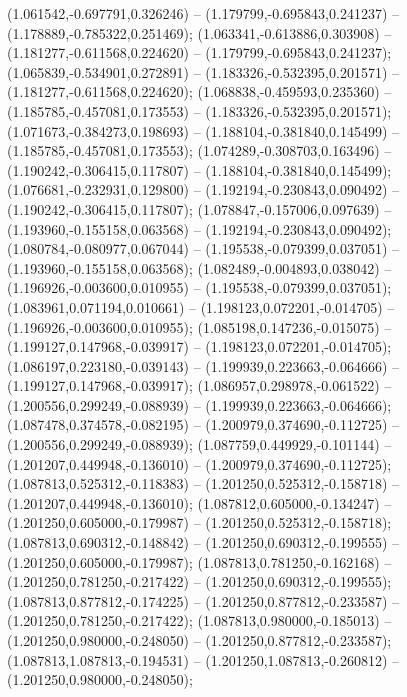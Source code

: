  (1.061542,-0.697791,0.326246) -- (1.179799,-0.695843,0.241237) -- (1.178889,-0.785322,0.251469);
 (1.063341,-0.613886,0.303908) -- (1.181277,-0.611568,0.224620) -- (1.179799,-0.695843,0.241237);
 (1.065839,-0.534901,0.272891) -- (1.183326,-0.532395,0.201571) -- (1.181277,-0.611568,0.224620);
 (1.068838,-0.459593,0.235360) -- (1.185785,-0.457081,0.173553) -- (1.183326,-0.532395,0.201571);
 (1.071673,-0.384273,0.198693) -- (1.188104,-0.381840,0.145499) -- (1.185785,-0.457081,0.173553);
 (1.074289,-0.308703,0.163496) -- (1.190242,-0.306415,0.117807) -- (1.188104,-0.381840,0.145499);
 (1.076681,-0.232931,0.129800) -- (1.192194,-0.230843,0.090492) -- (1.190242,-0.306415,0.117807);
 (1.078847,-0.157006,0.097639) -- (1.193960,-0.155158,0.063568) -- (1.192194,-0.230843,0.090492);
 (1.080784,-0.080977,0.067044) -- (1.195538,-0.079399,0.037051) -- (1.193960,-0.155158,0.063568);
 (1.082489,-0.004893,0.038042) -- (1.196926,-0.003600,0.010955) -- (1.195538,-0.079399,0.037051);
 (1.083961,0.071194,0.010661) -- (1.198123,0.072201,-0.014705) -- (1.196926,-0.003600,0.010955);
 (1.085198,0.147236,-0.015075) -- (1.199127,0.147968,-0.039917) -- (1.198123,0.072201,-0.014705);
 (1.086197,0.223180,-0.039143) -- (1.199939,0.223663,-0.064666) -- (1.199127,0.147968,-0.039917);
 (1.086957,0.298978,-0.061522) -- (1.200556,0.299249,-0.088939) -- (1.199939,0.223663,-0.064666);
 (1.087478,0.374578,-0.082195) -- (1.200979,0.374690,-0.112725) -- (1.200556,0.299249,-0.088939);
 (1.087759,0.449929,-0.101144) -- (1.201207,0.449948,-0.136010) -- (1.200979,0.374690,-0.112725);
 (1.087813,0.525312,-0.118383) -- (1.201250,0.525312,-0.158718) -- (1.201207,0.449948,-0.136010);
 (1.087812,0.605000,-0.134247) -- (1.201250,0.605000,-0.179987) -- (1.201250,0.525312,-0.158718);
 (1.087813,0.690312,-0.148842) -- (1.201250,0.690312,-0.199555) -- (1.201250,0.605000,-0.179987);
 (1.087813,0.781250,-0.162168) -- (1.201250,0.781250,-0.217422) -- (1.201250,0.690312,-0.199555);
 (1.087813,0.877812,-0.174225) -- (1.201250,0.877812,-0.233587) -- (1.201250,0.781250,-0.217422);
 (1.087813,0.980000,-0.185013) -- (1.201250,0.980000,-0.248050) -- (1.201250,0.877812,-0.233587);
 (1.087813,1.087813,-0.194531) -- (1.201250,1.087813,-0.260812) -- (1.201250,0.980000,-0.248050);
